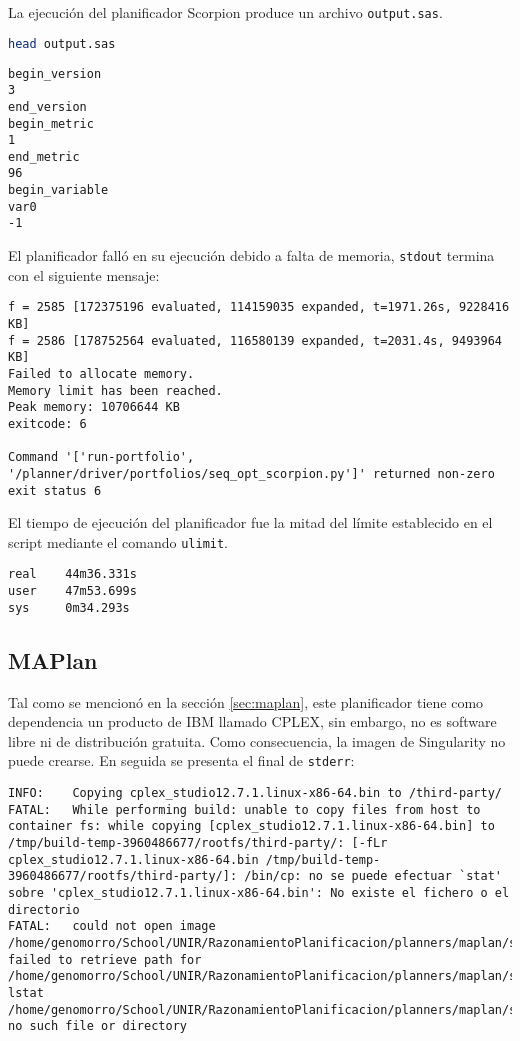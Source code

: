 \documentclass[a4paper,12pt,twocolumn]{article}
\begin{document}
La ejecución del planificador Scorpion produce un archivo \texttt{output.sas}.
\begin{lstlisting}[language=sh]
  head output.sas
\end{lstlisting}
\begin{lstlisting}[style=consola]
begin_version
3
end_version
begin_metric
1
end_metric
96
begin_variable
var0
-1
\end{lstlisting}
El planificador falló en su ejecución debido a falta de memoria, \texttt{stdout} termina con el siguiente mensaje:
\begin{lstlisting}[style=consola]
f = 2585 [172375196 evaluated, 114159035 expanded, t=1971.26s, 9228416 KB]
f = 2586 [178752564 evaluated, 116580139 expanded, t=2031.4s, 9493964 KB]
Failed to allocate memory.
Memory limit has been reached.
Peak memory: 10706644 KB
exitcode: 6

Command '['run-portfolio', '/planner/driver/portfolios/seq_opt_scorpion.py']' returned non-zero exit status 6
\end{lstlisting}

El tiempo de ejecución del planificador fue la mitad del límite establecido en el script mediante el comando \texttt{ulimit}.

\begin{lstlisting}[style=consola]
real    44m36.331s
user    47m53.699s
sys     0m34.293s
\end{lstlisting}

\subsection{MAPlan}

Tal como se mencionó en la sección \ref{sec:maplan}, este planificador tiene como dependencia un producto de IBM llamado CPLEX, sin embargo, no es software libre ni de distribución gratuita. Como consecuencia, la imagen de Singularity no puede crearse. En seguida se presenta el final de \texttt{stderr}:

\begin{lstlisting}
INFO:    Copying cplex_studio12.7.1.linux-x86-64.bin to /third-party/
FATAL:   While performing build: unable to copy files from host to container fs: while copying [cplex_studio12.7.1.linux-x86-64.bin] to /tmp/build-temp-3960486677/rootfs/third-party/: [-fLr cplex_studio12.7.1.linux-x86-64.bin /tmp/build-temp-3960486677/rootfs/third-party/]: /bin/cp: no se puede efectuar `stat' sobre 'cplex_studio12.7.1.linux-x86-64.bin': No existe el fichero o el directorio
FATAL:   could not open image /home/genomorro/School/UNIR/RazonamientoPlanificacion/planners/maplan/singularity.img: failed to retrieve path for /home/genomorro/School/UNIR/RazonamientoPlanificacion/planners/maplan/singularity.img: lstat /home/genomorro/School/UNIR/RazonamientoPlanificacion/planners/maplan/singularity.img: no such file or directory
\end{lstlisting}
\end{document}

